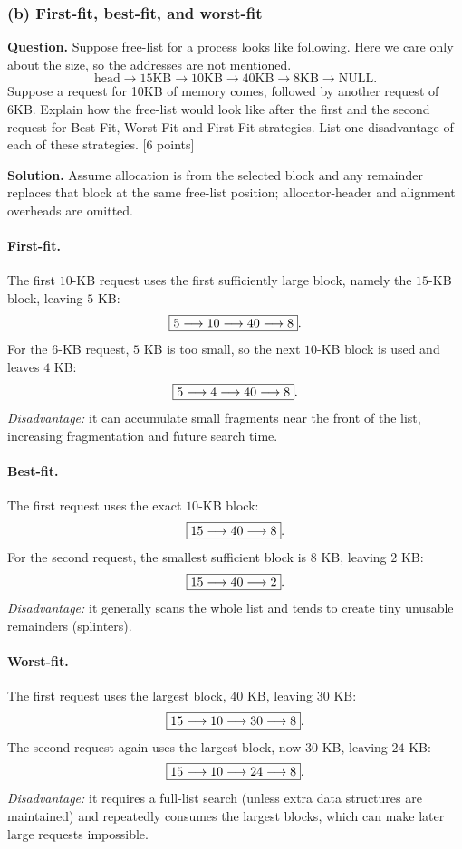 \subsubsection*{(b) First-fit, best-fit, and worst-fit}
\textbf{Question.} Suppose free-list for a process looks like following. Here
we care only about the size, so the addresses are not mentioned.
\[
  \mbox{head}\longrightarrow 15\mbox{KB}\longrightarrow10\mbox{KB}
  \longrightarrow40\mbox{KB}\longrightarrow8\mbox{KB}
  \longrightarrow\mathrm{NULL}.
\]
Suppose a request for 10KB of memory comes, followed by another request of
6KB. Explain how the free-list would look like after the first and the second
request for Best-Fit, Worst-Fit and First-Fit strategies. List one disadvantage
of each of these strategies. \hfill [6 points]

\textbf{Solution.}
Assume allocation is from the selected block and any remainder replaces that
block at the same free-list position; allocator-header and alignment overheads
are omitted.

\paragraph{First-fit.}
The first \(10\)-KB request uses the first sufficiently large block, namely
the \(15\)-KB block, leaving \(5\) KB:
\[
  \fbox{\(5\longrightarrow10\longrightarrow40\longrightarrow8\)}.
\]
For the \(6\)-KB request, \(5\) KB is too small, so the next \(10\)-KB block is
used and leaves \(4\) KB:
\[
  \fbox{\(5\longrightarrow4\longrightarrow40\longrightarrow8\)}.
\]
\emph{Disadvantage:} it can accumulate small fragments near the front of the
list, increasing fragmentation and future search time.

\paragraph{Best-fit.}
The first request uses the exact \(10\)-KB block:
\[
  \fbox{\(15\longrightarrow40\longrightarrow8\)}.
\]
For the second request, the smallest sufficient block is \(8\) KB, leaving
\(2\) KB:
\[
  \fbox{\(15\longrightarrow40\longrightarrow2\)}.
\]
\emph{Disadvantage:} it generally scans the whole list and tends to create
tiny unusable remainders (splinters).

\paragraph{Worst-fit.}
The first request uses the largest block, \(40\) KB, leaving \(30\) KB:
\[
  \fbox{\(15\longrightarrow10\longrightarrow30\longrightarrow8\)}.
\]
The second request again uses the largest block, now \(30\) KB, leaving
\(24\) KB:
\[
  \fbox{\(15\longrightarrow10\longrightarrow24\longrightarrow8\)}.
\]
\emph{Disadvantage:} it requires a full-list search (unless extra data
structures are maintained) and repeatedly consumes the largest blocks, which
can make later large requests impossible.
